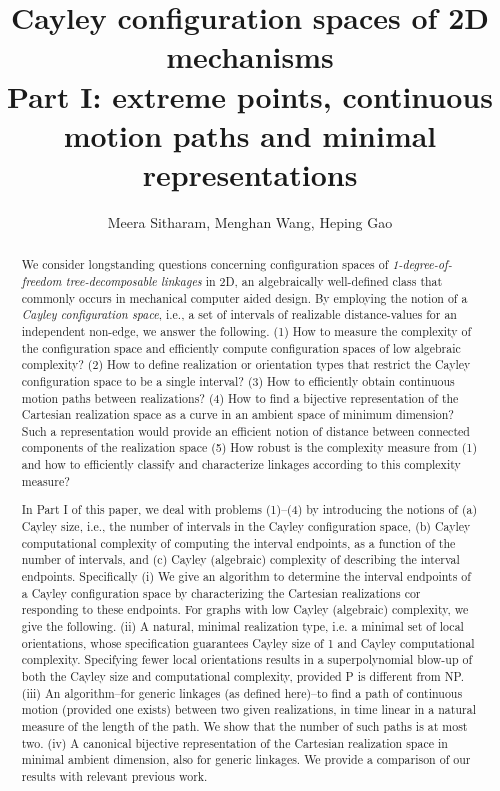 \documentclass[secthm,amsthm,english]{article}
\theoremstyle{definition}
\theoremstyle{remark}
\begin{document}
\title{Cayley configuration spaces of 2D mechanisms\\
Part I: extreme points, continuous motion paths and minimal representations}


\author{Meera Sitharam, Menghan Wang, Heping Gao}







\maketitle


\begin{abstract}

We consider longstanding questions concerning configuration spaces of
\emph{1-degree-of-freedom tree-decomposable linkages} in 2D, an algebraically
well-defined class that commonly occurs in mechanical computer aided
design. By employing the notion of a \emph{Cayley configuration space}, i.e., a
set of intervals of realizable
distance-values for an independent non-edge, we answer the following.
 (1) How to measure the complexity of the configuration space and efficiently compute configuration
spaces of low algebraic
complexity? (2) How to define realization or orientation types that restrict the Cayley
configuration space to be a single interval? (3) How to efficiently obtain continuous motion paths between realizations?
(4) How to find a bijective representation of the Cartesian
realization space as a curve in an ambient space of minimum dimension? Such a representation would provide an efficient notion of
distance between connected components of
the realization space (5) How robust is the complexity measure from (1) and how to
efficiently classify and characterize linkages according to
this complexity measure?

In Part I of this paper, we deal with problems (1)--(4) by introducing the
notions of (a) Cayley size, i.e., the
number of intervals in the Cayley configuration space, (b) Cayley
computational complexity of computing the interval endpoints, as a function of the
number of intervals, and (c) Cayley
(algebraic) complexity of describing the interval endpoints.
Specifically
(i) We give an algorithm to determine the interval endpoints of 
a Cayley configuration space by characterizing the Cartesian realizations cor
responding to these endpoints. 
For graphs with low Cayley (algebraic) complexity, we give the following. 
(ii) A natural,
minimal realization type, i.e. a minimal set of local orientations, whose specification guarantees Cayley size
of 1 and
 Cayley computational complexity. Specifying fewer local
orientations
results in a superpolynomial blow-up of both the Cayley size
and computational complexity, provided P is different from NP. 
(iii) An algorithm--for generic linkages (as defined here)--to
find a path of continuous motion
(provided one exists) between two given realizations, in time linear in a natural measure
of the length of the path. We show that the number of such paths
is at most two. 
(iv)
A canonical
bijective representation of the Cartesian realization space in minimal ambient dimension,
also for generic linkages.
We provide a comparison of our results with relevant previous work.


\end{abstract}
\end{document}
